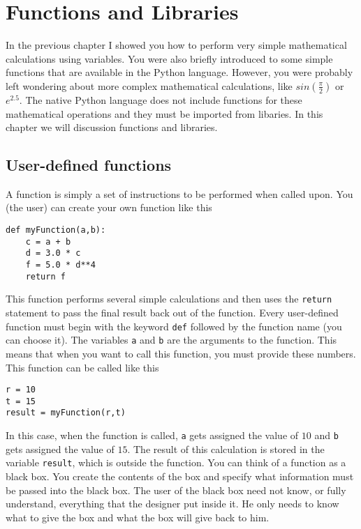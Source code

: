 \chapter{Functions and Libraries}
\label{chap:Functions}

In the previous chapter I showed you how to perform very simple
mathematical calculations using variables.  You were also briefly
introduced to some simple functions that are available in the Python
language.  However, you were probably left wondering about more complex
mathematical calculations, like $sin(\frac{\pi}{2})$ or $e^{2.5}$.
The native Python language does not include functions for these
mathematical operations and they must be imported from libaries.  In
this chapter we will discussion functions and libraries.

\section{User-defined functions}
A function is simply a set of instructions to be performed when called
upon.  You (the user) can create your own function like this
\begin{Verbatim}
def myFunction(a,b):
    c = a + b
    d = 3.0 * c
    f = 5.0 * d**4
    return f
\end{Verbatim}
This function performs several simple calculations and then uses the
\texttt{return} statement to pass the final result back out of the
function.  Every user-defined function must begin with the keyword
\texttt{def} followed by the function name (you can choose it). The
variables \texttt{a} and \texttt{b} are the arguments to the function.
This means that when you want to call this function, you must provide
these numbers.  This function can be called like this
\begin{Verbatim}
r = 10
t = 15
result = myFunction(r,t)
\end{Verbatim}
In this case, when the function is called, \texttt{a} gets assigned
the value of $10$ and \texttt{b} gets assigned the value of $15$.  The
result of this calculation is stored in the variable \texttt{result},
which is outside the function.  You can think of a function as a black
box. You create the contents of the box and specify what information
must be passed into the black box.  The user of the black box need not
know, or fully understand, everything that the designer put inside
it.  He only needs to know what to give the box and what the box will
give back to him.

